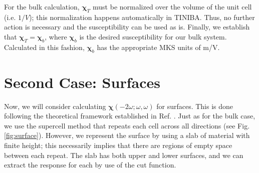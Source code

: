 \documentclass[letterpaper,10pt]{article}
\begin{document}
For the bulk calculation, $\boldsymbol{\chi}_{T}$ must be normalized over the
volume of the unit cell (i.e. $1/V$); this normalization happens
automatically in TINIBA. Thus, no further action is necessary and the
susceptibility can be used as is. Finally, we establish that
$\boldsymbol{\chi}_{T} = \boldsymbol{\chi}_{b}$, where $\boldsymbol{\chi}_{b}$
is the desired susceptibility for our bulk system. Calculated in this fashion,
$\boldsymbol{\chi}_{b}$ has the appropriate MKS units of m/V.



\section*{Second Case: Surfaces}

Now, we will consider calculating $\boldsymbol{\chi}(-2\omega;\omega,\omega)$
for surfaces. This is done following the theoretical framework established in
Ref. \cite{andersonPRB15}. Just as for the bulk case, we use the supercell
method that repeats each cell across all directions (see Fig.
\ref{fig:surface}). However, we represent the surface by using a slab of
material with finite height; this necessarily implies that there are regions of
empty space between each repeat. The slab has both upper and lower surfaces, and
we can extract the response for each by use of the cut function.
\end{document}
